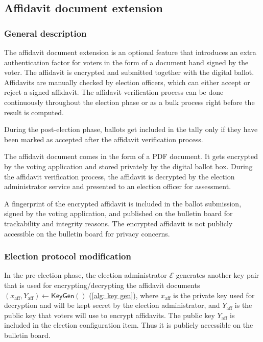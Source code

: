 \subsection{Affidavit document extension} \label{app: affidavit document extension}


\subsubsection{General description}
The affidavit document extension is an optional feature that introduces an extra authentication factor for voters in the form of a document hand signed by the voter. The affidavit is encrypted and submitted together with the digital ballot. Affidavits are manually checked by election officers, which can either accept or reject a signed affidavit. The affidavit verification process can be done continuously throughout the election phase or as a bulk process right before the result is computed.

During the post-election phase, ballots get included in the tally only if they have been marked as accepted after the affidavit verification process.

The affidavit document comes in the form of a PDF document. It gets encrypted by the voting application and stored privately by the digital ballot box. During the affidavit verification process, the affidavit is decrypted by the election administrator service and presented to an election officer for assessment.

A fingerprint of the encrypted affidavit is included in the ballot submission, signed by the voting application, and published on the bulletin board for trackability and integrity reasons. The encrypted affidavit is not publicly accessible on the bulletin board for privacy concerns. 


\subsubsection{Election protocol modification}
In the pre-election phase, the election administrator $\mathcal{E}$ generates another key pair that is used for encrypting/decrypting the affidavit documents $(x_\mathrm{aff}, Y_\mathrm{aff}) \gets \mathsf{KeyGen}()$ (\cref{alg: key gen}), where $x_\mathrm{aff}$ is the private key used for decryption and will be kept secret by the election administrator, and $Y_\mathrm{aff}$ is the public key that voters will use to encrypt affidavits. The public key $Y_\mathrm{aff}$ is included in the election configuration item. Thus it is publicly accessible on the bulletin board.

